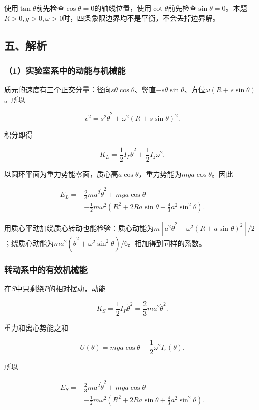 \documentclass[12pt,a4paper,fontset=fandol]{ctexart}
\begin{document}
使用\(\tan\theta\)前先检查\(\cos\theta=0\)的轴线位置，使用\(\cot\theta\)前先检查\(\sin\theta=0\)。本题\(R>0,g>0,\omega>0\)时，四条象限边界均不是平衡，不会丢掉边界解。

\subsection{五、解析}\label{ux4e94ux89e3ux6790-3}

\subsubsection{（1）实验室系中的动能与机械能}\label{ux5b9eux9a8cux5ba4ux7cfbux4e2dux7684ux52a8ux80fdux4e0eux673aux68b0ux80fd}

质元的速度有三个正交分量：径向\(s\dot\theta\cos\theta\)、竖直\(-s\dot\theta\sin\theta\)、方位\(\omega(R+s\sin\theta)\)。所以

\[
v^2=s^2\dot\theta^2+\omega^2(R+s\sin\theta)^2.
\]

积分即得

\[
K_L=\frac12I_P\dot\theta^2+\frac12I_z\omega^2.
\]

以圆环平面为重力势能零面，质心高\(a\cos\theta\)，重力势能为\(mga\cos\theta\)。因此

\[
\boxed{
\begin{aligned}
E_L={}&\frac23ma^2\dot\theta^2+mga\cos\theta\\
&+\frac12m\omega^2
\left(R^2+2Ra\sin\theta+\frac43a^2\sin^2\theta\right).
\end{aligned}}
\]

用质心平动加绕质心转动也能检验：质心动能为\(m[a^2\dot\theta^2+\omega^2(R+a\sin\theta)^2]/2\)；绕质心动能为\(ma^2(\dot\theta^2+\omega^2\sin^2\theta)/6\)。相加得到同样的系数。

\subsubsection{转动系中的有效机械能}\label{ux8f6cux52a8ux7cfbux4e2dux7684ux6709ux6548ux673aux68b0ux80fd}

在\(S\)中只剩绕\(P\)的相对摆动，动能

\[
K_S=\frac12I_P\dot\theta^2=\frac23ma^2\dot\theta^2.
\]

重力和离心势能之和

\[
U(\theta)=mga\cos\theta-\frac12\omega^2I_z(\theta).
\]

所以

\[
\boxed{
\begin{aligned}
E_S={}&\frac23ma^2\dot\theta^2+mga\cos\theta\\
&-\frac12m\omega^2
\left(R^2+2Ra\sin\theta+\frac43a^2\sin^2\theta\right).
\end{aligned}}
\]
\end{document}
